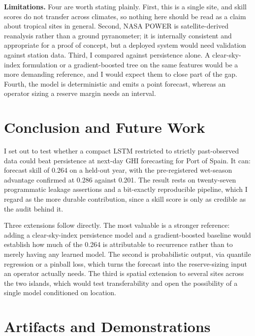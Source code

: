 \documentclass{article}
\begin{document}
\textbf{Limitations.} Four are worth stating plainly. First, this is a single
site, and skill scores do not transfer across climates, so nothing here should be
read as a claim about tropical sites in general. Second, NASA POWER is
satellite-derived reanalysis rather than a ground pyranometer; it is internally
consistent and appropriate for a proof of concept, but a deployed system would
need validation against station data. Third, I compared against persistence
alone. A clear-sky-index formulation \cite{yang2020choice} or a gradient-boosted
tree on the same features would be a more demanding reference, and I would expect
them to close part of the gap. Fourth, the model is deterministic and emits a
point forecast, whereas an operator sizing a reserve margin needs an interval.

\section{Conclusion and Future Work}

I set out to test whether a compact LSTM restricted to strictly past-observed
data could beat persistence at next-day GHI forecasting for Port of Spain. It
can: forecast skill of 0.264 on a held-out year, with the pre-registered
wet-season advantage confirmed at 0.286 against 0.201. The result rests on
twenty-seven programmatic leakage assertions and a bit-exactly reproducible
pipeline, which I regard as the more durable contribution, since a skill score is
only as credible as the audit behind it.

Three extensions follow directly. The most valuable is a stronger reference:
adding a clear-sky-index persistence model and a gradient-boosted baseline would
establish how much of the 0.264 is attributable to recurrence rather than to
merely having any learned model. The second is probabilistic output, via quantile
regression or a pinball loss, which turns the forecast into the reserve-sizing
input an operator actually needs. The third is spatial extension to several sites
across the two islands, which would test transferability and open the possibility
of a single model conditioned on location.

\section{Artifacts and Demonstrations}
\end{document}
